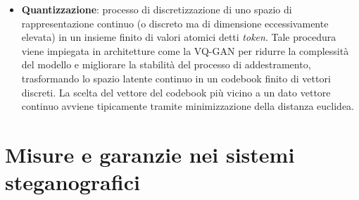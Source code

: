 \begin{itemize}
	\item \textbf{Quantizzazione}: processo di discretizzazione di uno spazio di rappresentazione continuo (o discreto ma di dimensione eccessivamente elevata) in un insieme finito di valori atomici detti \emph{token}. Tale procedura viene impiegata in architetture come la VQ-GAN per ridurre la complessità del modello e migliorare la stabilità del processo di addestramento, trasformando lo spazio latente continuo in un codebook finito di vettori discreti. La scelta del vettore del codebook più vicino a un dato vettore continuo avviene tipicamente tramite minimizzazione della distanza euclidea.
\end{itemize}

\section{Misure e garanzie nei sistemi steganografici}
